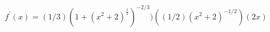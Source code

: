 $ \displaystyle f^{\prime}(x) = (1/3)(1 + (x^2 + 2)^{\frac{1}{2}})^{-2/3})((1/2)(x^2+2)^{-1/2})(2x) $